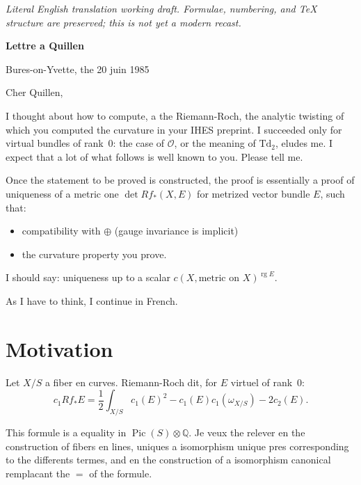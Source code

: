 \documentclass[11pt,a4paper]{article}
\theoremstyle{plain}
\theoremstyle{definition}
\DeclareMathOperator{\Pic}{Pic}
\DeclareMathOperator{\rg}{rg}
\newcommand{\Q}{\mathbb{Q}}
\newcommand{\cO}{\mathcal{O}}
\begin{document}
\begin{center}\small\emph{Literal English translation working draft. Formulae, numbering, and TeX structure are preserved; this is not yet a modern recast.}\end{center}
\vspace{0.5em}


\begin{center}
\textbf{\Large Lettre a Quillen}
\end{center}

\vspace{1cm}

\noindent\hfill Bures-on-Yvette, the 20 juin 1985

\vspace{0.5cm}

\noindent Cher Quillen,

\medskip

I thought about how to compute, a the Riemann-Roch, the analytic twisting of which you computed the curvature in your IHES preprint. I succeeded only for virtual bundles of rank~0: the case of $\cO$, or the meaning of $\mathrm{Td}_2$, eludes me. I expect that a lot of what follows is well known to you. Please tell me.

Once the statement to be proved is constructed, the proof is essentially a proof of uniqueness of a metric one $\det Rf_*(X,E)$ for metrized vector bundle $E$, such that:
\begin{itemize}
\item compatibility with $\oplus$ (gauge invariance is implicit)
\item the curvature property you prove.
\end{itemize}
I should say: uniqueness up to a scalar $c(X, \text{metric on } X)^{\rg E}$.

As I have to think, I continue in French.

\tableofcontents

\newpage

\section{Motivation}

Let $X/S$ a fiber en curves. Riemann-Roch dit, for $E$ virtuel of rank~0:
\begin{equation}
c_1 Rf_* E = \frac{1}{2} \int_{X/S} c_1(E)^2 - c_1(E) c_1(\omega_{X/S}) - 2c_2(E).
\end{equation}

This formule is a equality in $\Pic(S) \otimes \Q$. Je veux the relever en the construction of fibers en lines, uniques a isomorphism unique pres corresponding to the differents termes, and en the construction of a isomorphism canonical remplacant the $=$ of the formule.
\end{document}
